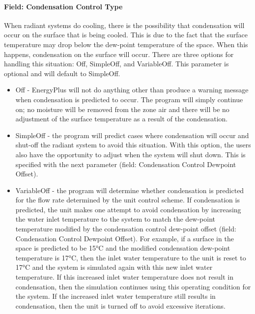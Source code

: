 \paragraph{Field: Condensation Control Type}\label{field-condensation-control-type-1}

When radiant systems do cooling, there is the possibility that condensation will occur on the surface that is being cooled. This is due to the fact that the surface temperature may drop below the dew-point temperature of the space. When this happens, condensation on the surface will occur. There are three options for handling this situation: Off, SimpleOff, and VariableOff. This parameter is optional and will default to SimpleOff.

\begin{itemize}
\item
  Off - EnergyPlus will not do anything other than produce a warning message when condensation is predicted to occur. The program will simply continue on; no moisture will be removed from the zone air and there will be no adjustment of the surface temperature as a result of the condensation.
\item
  SimpleOff - the program will predict cases where condensation will occur and shut-off the radiant system to avoid this situation. With this option, the users also have the opportunity to adjust when the system will shut down. This is specified with the next parameter (field: Condensation Control Dewpoint Offset).
\item
  VariableOff - the program will determine whether condensation is predicted for the flow rate determined by the unit control scheme.  If condensation is predicted, the unit makes one attempt to avoid condensation by increasing the water inlet temperature to the system to match the dew-point temperature modified by the condensation control dew-point offset (field: Condensation Control Dewpoint Offset). For example, if a surface in the space is predicted to be 15°C and the modified condensation dew-point temperature is 17°C, then the inlet water temperature to the unit is reset to 17°C and the system is simulated again with this new inlet water temperature.  If this increased inlet water temperature does not result in condensation, then the simulation continues using this operating condition for the system.  If the increased inlet water temperature still results in condensation, then the unit is turned off to avoid excessive iterations.
\end{itemize}

